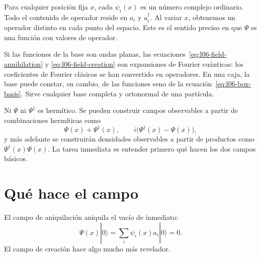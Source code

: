 Para cualquier posición fija \(x\), cada \(\psi_i(x)\) es un número complejo ordinario. Todo el contenido de operador reside en \(a_i\) y \(a_i^\dagger\). Al variar \(x\), obtenemos un operador distinto en cada punto del espacio. Este es el sentido preciso en que \(\Psi\) es una función con valores de operador.

Si las funciones de la base son ondas planas, las ecuaciones~\eqref{eq:l06-field-annihilation} y \eqref{eq:l06-field-creation} son expansiones de Fourier cuánticas: los coeficientes de Fourier clásicos se han convertido en operadores. En una caja, la base puede constar, en cambio, de las funciones seno de la ecuación~\eqref{eq:l06-box-basis}. Sirve cualquier base completa y ortonormal de una partícula.

Ni \(\Psi\) ni \(\Psi^\dagger\) es hermítico. Se pueden construir campos observables a partir de combinaciones hermíticas como
\begin{equation}
\Psi(x)+\Psi^\dagger(x),
\qquad
i\bigl(\Psi^\dagger(x)-\Psi(x)\bigr),
\end{equation}
y más adelante se construirán densidades observables a partir de productos como \(\Psi^\dagger(x)\Psi(x)\). La tarea inmediata es entender primero qué hacen los dos campos básicos.

\begin{classroomqa}
\end{classroomqa}

\section{Qué hace el campo}

El campo de aniquilación aniquila el vacío de inmediato:
\begin{equation}
\Psi(x)|0\rangle
=\sum_i\psi_i(x)a_i|0\rangle
=0.
\label{eq:l06-field-kills-vacuum}
\end{equation}
El campo de creación hace algo mucho más revelador.

